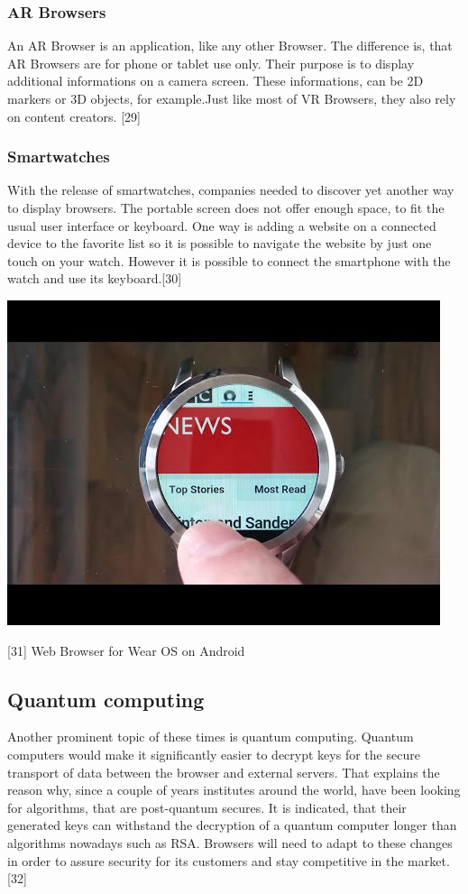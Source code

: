 \documentclass[runningheads]{llncs}
\begin{document}
			\subsubsection{AR Browsers}
				\leavevmode\newline
				An AR Browser is an application, like any other Browser. The difference is, that AR Browsers are for phone or tablet use only. Their purpose is to display additional informations on a camera screen. These informations, can be 2D markers or 3D objects, for example.Just like most of VR Browsers, they also rely on content creators. 
				[29]
			\subsubsection{Smartwatches}
			\leavevmode\newline
			With the release of smartwatches, companies needed to discover yet another way to display browsers. The portable screen does not offer enough space, to fit the usual user interface or keyboard. One way is adding a website on a connected device to the favorite list so it is possible to navigate the website by just one touch on your watch.	
			 However it is possible to connect the smartphone with the watch and use its keyboard.[30]
			\begin{center}
				\includegraphics[scale=0.35]{Smartwatch.jpg}
				
				[31] Web Browser for Wear OS on Android	
			\end{center}
		\subsection{Quantum computing}
		\leavevmode\newline
		Another prominent topic of these times is quantum computing. Quantum computers would make it significantly easier to decrypt keys for the secure transport of data between the browser and external servers. That explains the reason why, since a couple of years institutes around the world, have been looking for algorithms, that are post-quantum secures. It is indicated, that their generated keys can withstand the decryption of a quantum computer longer than algorithms nowadays such as RSA. Browsers will need to adapt to these changes in order to assure security for its customers and stay competitive in the market.
			[32]
\end{document}
